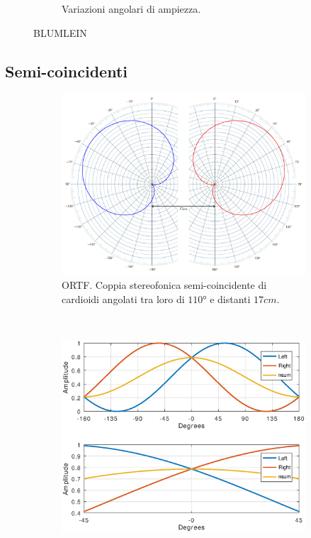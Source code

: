 \begin{figure}[t]
\begin{subfigure}[t]{0.99\textwidth}
        \caption{Variazioni angolari di ampiezza.}%
        \label{plot:blumlein}
    \end{subfigure}
    \caption{BLUMLEIN}
    \label{sp:blumlein}
\end{figure}

\clearpage

\subsection{Semi-coincidenti}

\begin{figure}[t]
    \centering
    \begin{subfigure}[t]{0.99\textwidth}
        \centering
        \includegraphics[width=11cm]{CAPITOLI/_TIKZ/POLAR/ORTF}
        \caption{ORTF. Coppia stereofonica semi-coincidente di cardioidi angolati tra loro di $110°$ e distanti $17cm$.}%
        \label{pol:ortfsp}
    \end{subfigure}%
    \\
    \begin{subfigure}[t]{0.99\textwidth}
        \centering
        \includegraphics[width=12.5cm]{CAPITOLI/1000/IMG/ortfsub}

\end{subfigure}
\end{figure}
